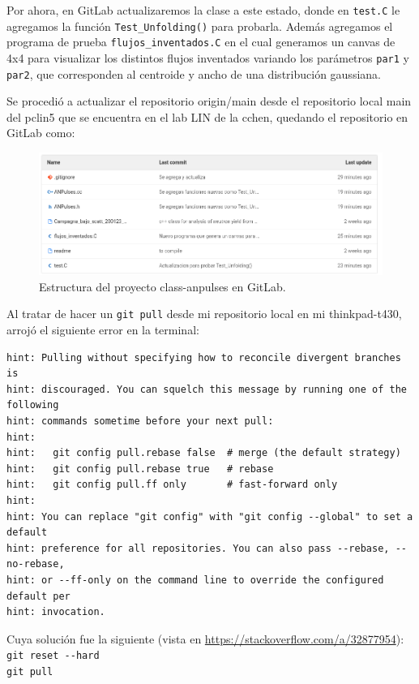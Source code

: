\documentclass[11pt,letterpaper]{article}
\begin{document}
Por ahora, en GitLab actualizaremos la clase a este estado, donde en \verb|test.C| le agregamos la función \verb|Test_Unfolding()| para probarla. Además agregamos el programa de prueba \verb|flujos_inventados.C| en el cual generamos un canvas de 4x4 para visualizar los distintos flujos inventados variando los parámetros \verb|par1|  y \verb|par2|, que corresponden al centroide y ancho de una distribución gaussiana.

Se procedió a actualizar el repositorio origin/main desde el repositorio local main del pclin5 que se encuentra en el lab LIN de la cchen, quedando el repositorio en GitLab como:


\begin{figure}[H]
    \includegraphics[width=1\textwidth]{img/Screenshot from 2021-11-23 15-58-25.png}
    \centering
    \caption{Estructura del proyecto class-anpulses  en GitLab.}
\end{figure}

Al tratar de hacer un \verb|git pull| desde mi repositorio local en mi thinkpad-t430, arrojó el siguiente error en la terminal:


\begin{lstlisting}
hint: Pulling without specifying how to reconcile divergent branches is
hint: discouraged. You can squelch this message by running one of the following
hint: commands sometime before your next pull:
hint: 
hint:   git config pull.rebase false  # merge (the default strategy)
hint:   git config pull.rebase true   # rebase
hint:   git config pull.ff only       # fast-forward only
hint: 
hint: You can replace "git config" with "git config --global" to set a default
hint: preference for all repositories. You can also pass --rebase, --no-rebase,
hint: or --ff-only on the command line to override the configured default per
hint: invocation.
\end{lstlisting}

\begin{tipt}
Cuya solución fue la siguiente (vista en \url{https://stackoverflow.com/a/32877954}):\\

\verb|git reset --hard|\\

\verb|git pull|
\end{tipt}
\end{document}
